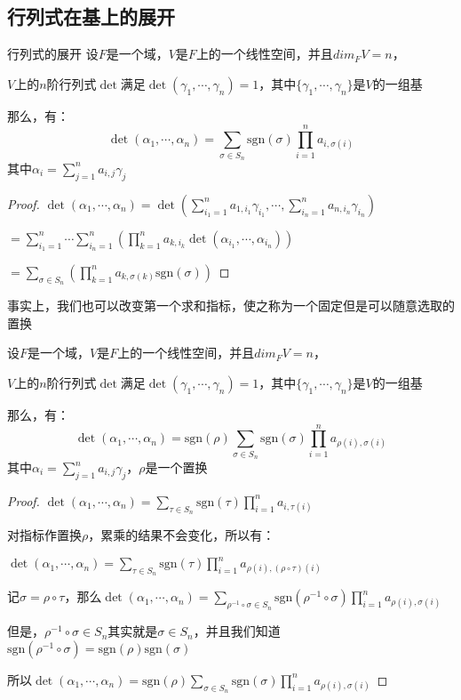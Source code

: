 \documentclass[12pt, a4paper, oneside, UTF8]{ctexbook}
\begin{document}
		\subsection{行列式在基上的展开}
			\begin{them}{行列式的展开}{}
				设$F$是一个域，$V$是$F$上的一个线性空间，并且$dim_F V = n$，
				
				$V$上的$n$阶行列式$\det$满足$\det(\gamma_1,\cdots,\gamma_n)=1$，其中$\{\gamma_1,\cdots,\gamma_n\}$是$V$的一组基

				那么，有：
				\begin{equation}
					\det(\alpha_1,\cdots,\alpha_n)=\sum_{\sigma \in S_n} \text{sgn}(\sigma) \prod_{i=1}^n a_{i,\sigma(i)}
				\end{equation}
				其中$\alpha_i = \sum\limits_{j=1}^{n} a_{i,j} \gamma_j$
			\end{them}
			\begin{proof}
				$\det (\alpha_1,\cdots,\alpha_n)=\det\left(\sum\limits_{i_1=1}^{n} a_{1,i_1} \gamma_{i_1},\cdots,\sum\limits_{i_n=1}^{n} a_{n,i_n} \gamma_{i_n}\right)$

				$=\sum\limits_{i_1=1}^{n}\cdots \sum\limits_{i_n=1}^{n} \left(\prod\limits_{k=1}^{n}a_{k,i_k} \det(\alpha_{i_1},\cdots,\alpha_{i_n})\right)$

				$=\sum\limits_{\sigma \in S_n} \left(\prod\limits_{k=1}^{n}a_{k,\sigma(k)} \text{sgn}(\sigma )\right)$
			\end{proof}
			事实上，我们也可以改变第一个求和指标，使之称为一个固定但是可以随意选取的置换
			\begin{corollary}{}{}
				设$F$是一个域，$V$是$F$上的一个线性空间，并且$dim_F V = n$，
				
				$V$上的$n$阶行列式$\det$满足$\det(\gamma_1,\cdots,\gamma_n)=1$，其中$\{\gamma_1,\cdots,\gamma_n\}$是$V$的一组基

				那么，有：
				\begin{equation}
					\det(\alpha_1,\cdots,\alpha_n)=\text{sgn}(\rho )\sum_{\sigma \in S_n} \text{sgn}(\sigma) \prod_{i=1}^n a_{\rho(i),\sigma(i)}
				\end{equation}
				其中$\alpha_i = \sum\limits_{j=1}^{n} a_{i,j} \gamma_j$，$\rho$是一个置换
			\end{corollary}
			\begin{proof}
				$\det(\alpha_1,\cdots,\alpha_n)=\sum_{\tau  \in S_n} \text{sgn}(\tau ) \prod_{i=1}^n a_{i,\tau (i)}$

				对指标作置换$\rho $，累乘的结果不会变化，所以有：

				$\det(\alpha_1,\cdots,\alpha_n)=\sum_{\tau \in S_n} \text{sgn}(\tau ) \prod_{i=1}^n a_{\rho(i),(\rho \circ \tau )(i)}$

				记$\sigma =\rho \circ \tau $，那么$\det(\alpha_1,\cdots,\alpha_n)=\sum_{\rho^{-1} \circ \sigma  \in S_n} \text{sgn}(\rho^{-1} \circ \sigma) \prod_{i=1}^n a_{\rho(i),\sigma (i)}$

				但是，$\rho^{-1} \circ \sigma \in S_n$其实就是$\sigma \in S_n$，并且我们知道$\text{sgn}(\rho^{-1} \circ \sigma)=\text{sgn}(\rho )\text{sgn}(\sigma )$

				所以$\det(\alpha_1,\cdots,\alpha_n)=\text{sgn}(\rho )\sum_{\sigma \in S_n} \text{sgn}(\sigma) \prod_{i=1}^n a_{\rho(i),\sigma(i)}$
			\end{proof}
\end{document}
